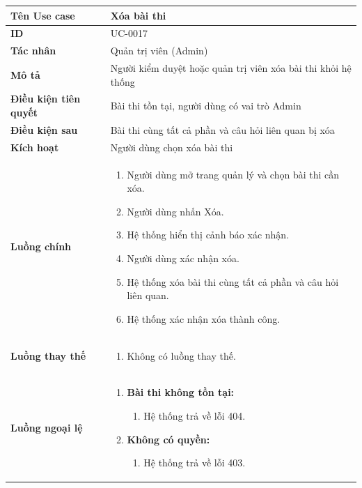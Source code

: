 {
\small
\renewcommand{\arraystretch}{1.15}

\begin{tabularx}{\textwidth}{|>{\raggedright\arraybackslash}p{3.5cm}|>{\raggedright\arraybackslash}X|}
\hline
\textbf{Tên Use case} & Xóa bài thi \\
\hline
\textbf{ID} & UC-0017 \\
\hline
\textbf{Tác nhân} & Quản trị viên (Admin) \\
\hline
\textbf{Mô tả} & Người kiểm duyệt hoặc quản trị viên xóa bài thi khỏi hệ thống \\
\hline
\textbf{Điều kiện tiên quyết} & Bài thi tồn tại, người dùng có vai trò Admin \\
\hline
\textbf{Điều kiện sau} & Bài thi cùng tất cả phần và câu hỏi liên quan bị xóa \\
\hline
\textbf{Kích hoạt} & Người dùng chọn xóa bài thi \\
\hline
\textbf{Luồng chính} &
\begin{enumerate}
    \item Người dùng mở trang quản lý và chọn bài thi cần xóa.
    \item Người dùng nhấn Xóa.
    \item Hệ thống hiển thị cảnh báo xác nhận.
    \item Người dùng xác nhận xóa.
    \item Hệ thống xóa bài thi cùng tất cả phần và câu hỏi liên quan.
    \item Hệ thống xác nhận xóa thành công.
\end{enumerate} \\
\hline
\textbf{Luồng thay thế} &
\begin{enumerate}
    \item Không có luồng thay thế.
\end{enumerate} \\
\hline
\textbf{Luồng ngoại lệ} &
\begin{enumerate}
    \item \textbf{Bài thi không tồn tại:}
    \begin{enumerate}
        \item[1Err.] Hệ thống trả về lỗi 404.
    \end{enumerate}
    \item \textbf{Không có quyền:}
    \begin{enumerate}
        \item[1Err2.] Hệ thống trả về lỗi 403.
    \end{enumerate}
\end{enumerate} \\
\hline
\end{tabularx}
}
